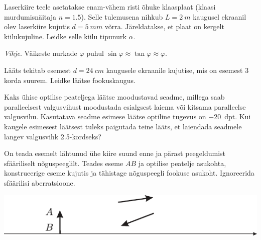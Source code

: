 \documentclass[10pt]{article}
\begin{document}
{%

Laserkiire teele asetatakse enam-vähem risti õhuke klaasplaat (klaasi murdumisnäitaja $n = \num{1,5}$). Selle tulemusena nihkub $L = \SI{2}{m}$ kaugusel ekraanil olev laserkiire kujutis $d = \SI{5}{mm}$ võrra. Järeldatakse, et plaat on kergelt kiilukujuline. Leidke selle kiilu tipunurk $\alpha$. 

\emph{Vihje}. Väikeste nurkade $\varphi$ puhul $\sin \varphi \approx \tan \varphi \approx \varphi$.
\probend
\bigskip


Lääts tekitab esemest $d = \SI{24}{cm}$ kaugusele ekraanile kujutise, mis on esemest \num{3} korda suurem. Leidke läätse fookuskaugus.
\probend
\bigskip


Kaks ühise optilise peateljega läätse moodustavad seadme, millega saab paralleelsest valgusvihust moodustada esialgsest laiema või kitsama paralleelse valgusvihu. Kasutatava seadme esimese läätse optiline tugevus on \SI{-20}{dpt}. Kui kaugele esimesest läätsest tuleks paigutada teine lääts, et laiendada seadmele langev valgusvihk \num{2.5}-kordseks?
\probend
\bigskip


On teada esemelt lähtunud ühe kiire suund enne ja pärast peegeldumist sfääriliselt nõguspeeglilt. Teades eseme $AB$ ja optilise peatelje asukohta, konstrueerige eseme kujutis ja tähistage nõguspeegli fookuse asukoht. Ignoreerida sfäärilisi aberratsioone.

\begin{center}
	\includegraphics[width=0.9\linewidth]{2006-v3g-02-yl}
\end{center}
\probend
\bigskip

}
\end{document}
